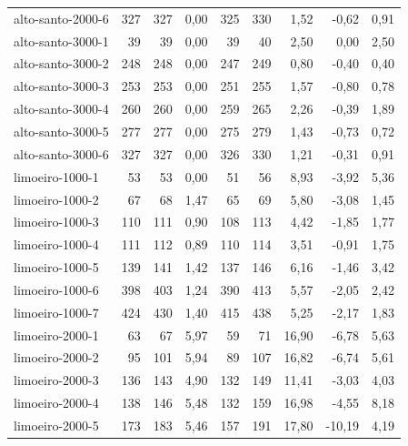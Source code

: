 \begin{table}[ht!]
{\begin{tabular}{lrrrrrrrr}
			alto-santo-2000-6                     & 327 & 327 & 0,00 & 325 & 330 & 1,52  & -0,62  & 0,91  \\
			alto-santo-3000-1                     & 39  & 39  & 0,00 & 39  & 40  & 2,50  & 0,00   & 2,50  \\
			alto-santo-3000-2                     & 248 & 248 & 0,00 & 247 & 249 & 0,80  & -0,40  & 0,40  \\
			alto-santo-3000-3                     & 253 & 253 & 0,00 & 251 & 255 & 1,57  & -0,80  & 0,78  \\
			alto-santo-3000-4                     & 260 & 260 & 0,00 & 259 & 265 & 2,26  & -0,39  & 1,89  \\
			alto-santo-3000-5                     & 277 & 277 & 0,00 & 275 & 279 & 1,43  & -0,73  & 0,72  \\
			alto-santo-3000-6                     & 327 & 327 & 0,00 & 326 & 330 & 1,21  & -0,31  & 0,91  \\ \hline
			limoeiro-1000-1                       & 53  & 53  & 0,00 & 51  & 56  & 8,93  & -3,92  & 5,36  \\
			limoeiro-1000-2                       & 67  & 68  & 1,47 & 65  & 69  & 5,80  & -3,08  & 1,45  \\
			limoeiro-1000-3                       & 110 & 111 & 0,90 & 108 & 113 & 4,42  & -1,85  & 1,77  \\
			limoeiro-1000-4                       & 111 & 112 & 0,89 & 110 & 114 & 3,51  & -0,91  & 1,75  \\
			limoeiro-1000-5                       & 139 & 141 & 1,42 & 137 & 146 & 6,16  & -1,46  & 3,42  \\
			limoeiro-1000-6                       & 398 & 403 & 1,24 & 390 & 413 & 5,57  & -2,05  & 2,42  \\
			limoeiro-1000-7                       & 424 & 430 & 1,40 & 415 & 438 & 5,25  & -2,17  & 1,83  \\
			limoeiro-2000-1                       & 63  & 67  & 5,97 & 59  & 71  & 16,90 & -6,78  & 5,63  \\
			limoeiro-2000-2                       & 95  & 101 & 5,94 & 89  & 107 & 16,82 & -6,74  & 5,61  \\
			limoeiro-2000-3                       & 136 & 143 & 4,90 & 132 & 149 & 11,41 & -3,03  & 4,03  \\
			limoeiro-2000-4                       & 138 & 146 & 5,48 & 132 & 159 & 16,98 & -4,55  & 8,18  \\
			limoeiro-2000-5                       & 173 & 183 & 5,46 & 157 & 191 & 17,80 & -10,19 & 4,19  \\

\end{tabular}}
\end{table}
